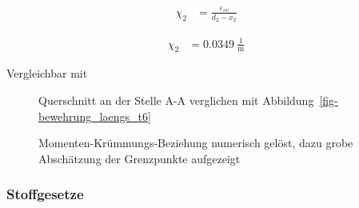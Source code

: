 \documentclass[
  11pt,
  letterpaper,
]{scrreprt}
\begin{document}
$$
\begin{aligned}
\chi_{2} &= \frac{ \varepsilon_{sv} }{ d_{2} - x_{2} } \; 
\end{aligned}
$$

$$
\begin{aligned}
\chi_{2} &= 0.0349\ \frac{1}{\mathrm{m}} \;
\end{aligned}
$$

Vergleichbar mit

\begin{figure}[H]


\caption{\label{fig-qs_a_a}Querschnitt an der Stelle A-A verglichen mit
Abbildung~\ref{fig-bewehrung_laengs_t6}}

\end{figure}%

\begin{figure}[H]


\caption{\label{fig-m_chi_schaetzung}Momenten-Krümmungs-Beziehung
numerisch gelöst, dazu grobe Abschätzung der Grenzpunkte aufgezeigt}

\end{figure}%

\subsubsection{Stoffgesetze}\label{stoffgesetze}
\end{document}
